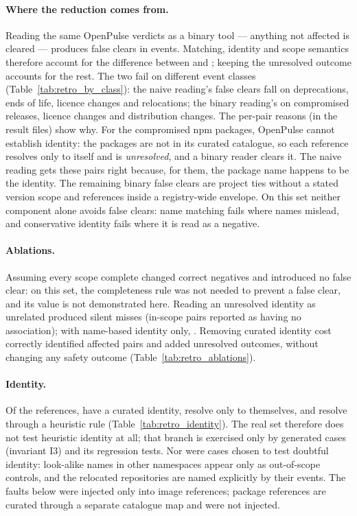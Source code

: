 \documentclass[11pt]{article}
\begin{document}
\paragraph{Where the reduction comes from.} Reading the same OpenPulse verdicts
as a binary tool --- anything not affected is cleared --- produces \FCbinary{}
false clears in \FCbinaryEvents{} events. Matching, identity and scope
semantics therefore account for the difference between \FCa{} and
\FCbinary{}; keeping the unresolved outcome accounts for the rest. The two
fail on different event classes (Table~\ref{tab:retro_by_class}): the naive
reading's false clears fall on deprecations, ends of life, licence changes and
relocations; the binary reading's on compromised releases, licence changes and
distribution changes. The per-pair reasons (in the result files) show why. For
the compromised npm packages, OpenPulse cannot establish identity: the
packages are not in its curated catalogue, so each reference resolves only to
itself and is \emph{unresolved}, and a binary reader clears it. The naive
reading gets these pairs right because, for them, the package name happens to
be the identity. The remaining binary false clears are project ties without a
stated version scope and references inside a registry-wide envelope. On this
set neither component alone avoids false clears: name matching fails where
names mislead, and conservative identity fails where it is read as a
negative.



\paragraph{Ablations.} Assuming every scope complete changed \ComplChanged{}
correct negatives and introduced no false clear: on this set, the
completeness rule was not needed to prevent a false clear, and its value is
not demonstrated here. Reading an unresolved identity as unrelated produced
\IdAblMiss{} silent misses (in-scope pairs reported as having no association);
with name-based identity only, \NameIdMiss{}. Removing curated identity cost
\NoCurAffectedDrop{} correctly identified affected pairs and added
\NoCurUnresRise{} unresolved outcomes, without changing any safety outcome
(Table~\ref{tab:retro_ablations}).



\paragraph{Identity.} Of the \RetroPairs{} references, \IdCurated{} have a
curated identity, \IdSelf{} resolve only to themselves, and
\IdHeuristic{} resolve through a heuristic rule
(Table~\ref{tab:retro_identity}). The real set therefore does not test
heuristic identity at all; that branch is exercised only by generated cases
(invariant I3) and its regression tests. Nor were cases chosen to test
doubtful identity: look-alike names in other namespaces appear only as
out-of-scope controls, and the relocated repositories are named explicitly by
their events. The faults below were injected only into image references;
package references are curated through a separate catalogue map and were not
injected.
\end{document}

